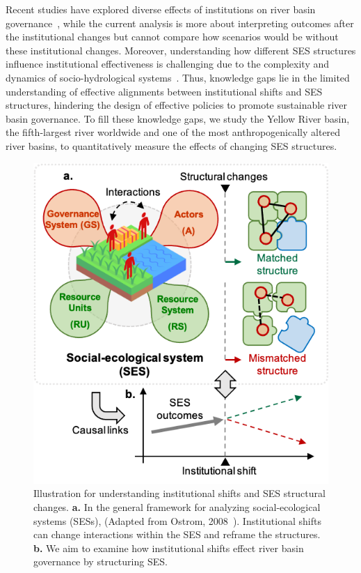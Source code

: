 \documentclass[preprint, 12pt]{elsarticle}
\begin{document}
Recent studies have explored diverse effects of institutions on river basin governance~\cite{bouckaert2022, vallury2022, loch2020, kirchhoff2016}, while the current analysis is more about interpreting outcomes after the institutional changes but cannot compare how scenarios would be without these institutional changes.
Moreover, understanding how different SES structures influence institutional effectiveness is challenging due to the complexity and dynamics of socio-hydrological systems~\cite{bodin2017b}.
Thus, knowledge gaps lie in the limited understanding of effective alignments between institutional shifts and SES structures, hindering the design of effective policies to promote sustainable river basin governance.
To fill these knowledge gaps, we study the Yellow River basin, the fifth-largest river worldwide and one of the most anthropogenically altered river basins, to quantitatively measure the effects of changing SES structures.

\begin{figure}[!ht]
	\centering
	\includegraphics[width=0.5\linewidth]{diagrams/framework.png}
	\caption{
		Illustration for understanding institutional shifts and SES structural changes. \textbf{a.} In the general framework for analyzing social-ecological systems (SESs), (Adapted from Ostrom, 2008~\cite{ostrom2009}). Institutional shifts can change interactions within the SES and reframe the structures.  \textbf{b.} We aim to examine how institutional shifts effect river basin governance by structuring SES.}\label{fig:framework}
\end{figure}
\end{document}
